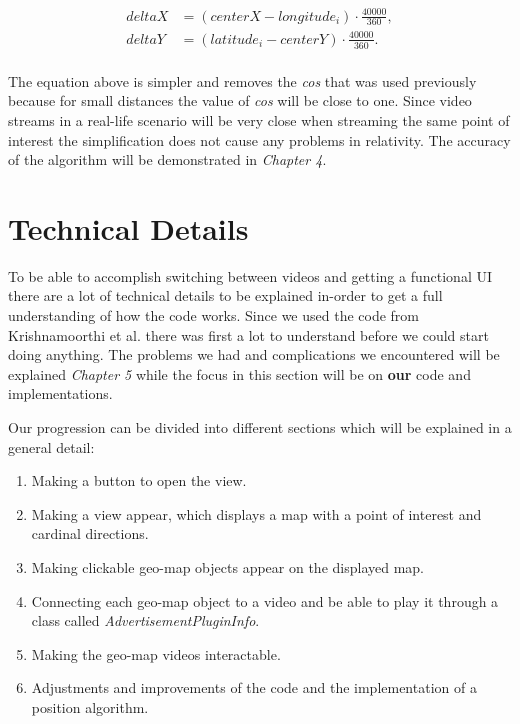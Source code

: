 \begin{align*}
deltaX &= (centerX-longitude_i)\cdot\frac{40000}{360}, \\
deltaY &= (latitude_i-centerY)\cdot\frac{40000}{360}. \\
\end{align*}

The equation above is simpler and removes the \textit{cos} that was used previously because for small distances the value of \textit{cos} will be close to one. Since video streams in a real-life scenario will be very close when streaming the same point of interest the simplification does not cause any problems in relativity. The accuracy of the algorithm will be demonstrated in \textit{Chapter 4}.

\section{Technical Details}
\label{sec:technicaldetails}

To be able to accomplish switching between videos and getting a functional UI there are a lot of technical details to be explained in-order to get a full understanding of how the code works. Since we used the code from Krishnamoorthi et al. \cite{qualbranch} there was first a lot to understand before we could start doing anything. The problems we had and complications we encountered will be explained \textit{Chapter 5} while the focus in this section will be on \textbf{our} code and implementations. 

\clearpage
Our progression can be divided into different sections which will be explained in a general detail:

\begin{enumerate}
\item Making a button to open the view.

\item Making a view appear, which displays a map with a point of interest and cardinal directions.

\item Making clickable geo-map objects appear on the displayed map.

\item Connecting each geo-map object to a video and be able to play it through a class called \textit{AdvertisementPluginInfo}.

\item Making the geo-map videos interactable.


\item Adjustments and improvements of the code and the implementation of a position algorithm. 
\end{enumerate}

